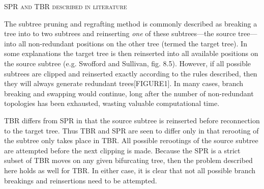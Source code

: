 \documentclass[12pt,letterpaper]{article}
\renewcommand{\section}[1]{%
\bigskip
\begin{center}
\begin{Large}
\normalfont\scshape #1
\medskip
\end{Large}
\end{center}}
\renewcommand{\subsection}[1]{%
\bigskip
\begin{center}
\begin{large}
\normalfont\itshape #1
\end{large}
\end{center}}
\begin{document}
\section{SPR and TBR described in literature}



The subtree pruning and regrafting method is commonly described as breaking a tree into to two subtrees and reinserting \textit{one} of these subtrees---the source tree---into all non-redundant positions on the other tree (termed the target tree).
In some explanations the target tree is then reinserted into all available positions on the source subtree (e.g. Swofford and Sullivan, fig. 8.5).
However, if all possible subtrees are clipped and reinserted exactly according to the rules described, then they will always generate redundant trees[FIGURE1].
In many cases, branch breaking and swapping would continue, long after the number of non-redundant topologies has been exhausted, wasting valuable computational time.

TBR differs from SPR in that the source subtree is reinserted before reconnection to the target tree.
Thus TBR and SPR are seen to differ only in that rerooting of the subtree only takes place in TBR.
All possible rerootings of the source subtree are attempted before the next clipping is made.
Because the SPR is a strict subset of TBR moves on any given bifurcating tree, then the problem described here holds as well for TBR.
In either case, it is clear that not all possible branch breakings and reinsertions need to be attempted.
\end{document}
